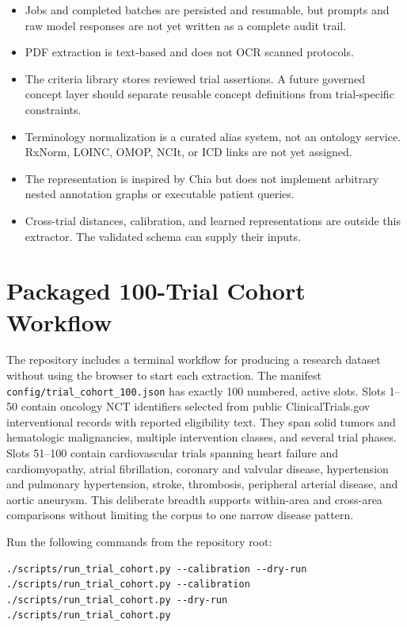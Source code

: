 \documentclass[11pt]{article}
\newcommand{\code}[1]{\nolinkurl{#1}}
\begin{document}
\begin{itemize}
  \item Jobs and completed batches are persisted and resumable, but prompts and raw model responses are not yet written as a complete audit trail.
  \item PDF extraction is text-based and does not OCR scanned protocols.
  \item The criteria library stores reviewed trial assertions. A future governed concept layer should separate reusable concept definitions from trial-specific constraints.
  \item Terminology normalization is a curated alias system, not an ontology service. RxNorm, LOINC, OMOP, NCIt, or ICD links are not yet assigned.
  \item The representation is inspired by Chia but does not implement arbitrary nested annotation graphs or executable patient queries.
  \item Cross-trial distances, calibration, and learned representations are outside this extractor. The validated schema can supply their inputs.
\end{itemize}

\section{Packaged 100-Trial Cohort Workflow}

The repository includes a terminal workflow for producing a research dataset without using the browser to start each extraction. The manifest \code{config/trial_cohort_100.json} has exactly 100 numbered, active slots. Slots 1--50 contain oncology NCT identifiers selected from public ClinicalTrials.gov interventional records with reported eligibility text. They span solid tumors and hematologic malignancies, multiple intervention classes, and several trial phases. Slots 51--100 contain cardiovascular trials spanning heart failure and cardiomyopathy, atrial fibrillation, coronary and valvular disease, hypertension and pulmonary hypertension, stroke, thrombosis, peripheral arterial disease, and aortic aneurysm. This deliberate breadth supports within-area and cross-area comparisons without limiting the corpus to one narrow disease pattern.

Run the following commands from the repository root:

\begin{verbatim}
./scripts/run_trial_cohort.py --calibration --dry-run
./scripts/run_trial_cohort.py --calibration
./scripts/run_trial_cohort.py --dry-run
./scripts/run_trial_cohort.py
\end{verbatim}
\end{document}
